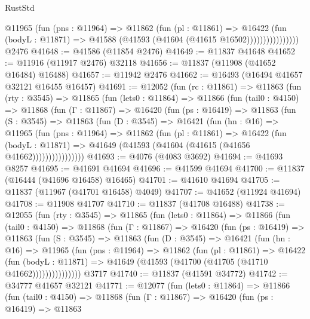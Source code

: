 \begin{lexlean}{RustStd}
\begin{coremodule}
                      @11965
                        (fun (pns : @11964) =>
                        @11862
                          (fun (pl : @11861) =>
                          @16422
                            (fun (bodyL : @11871) =>
                            @41588 (@41593 (@41604 (@41615 @16502))))))))))))))))
    @2476
@41648 := @41586 (@11854 @2476)
@41649 := @11837 @41648
@41652 := @11916 (@11917 @2476) @32118
@41656 := @11837 (@11908 (@41652 @16484) @16488)
@41657 := @11942 @2476
@41662 := @16493 (@16494 @41657 @32121 @16455 @16457)
@41691 := @12052
    (fun (rc : @11861) =>
    @11863
      (fun (rty : @3545) =>
      @11865
        (fun (lets0 : @11864) =>
        @11866
          (fun (tail0 : @4150) =>
          @11868
            (fun (Γ : @11867) =>
            @16420
              (fun (ps : @16419) =>
              @11863
                (fun (S : @3545) =>
                @11863
                  (fun (D : @3545) =>
                  @16421
                    (fun (hn : @16) =>
                    @11965
                      (fun (pns : @11964) =>
                      @11862
                        (fun (pl : @11861) =>
                        @16422
                          (fun (bodyL : @11871) =>
                          @41649 (@41593 (@41604 (@41615 (@41656 @41662))))))))))))))))
@41693 := @4076 (@4083 @3692)
@41694 := @41693 @8257
@41695 := @41691 @41694
@41696 := @41599 @41694
@41700 := @11837 (@16444 (@41696 @16458) @16465)
@41701 := @41610 @41694
@41705 := @11837 (@11967 (@41701 @16458) @4049)
@41707 := @41652 (@11924 @41694)
@41708 := @11908 @41707
@41710 := @11837 (@41708 @16488)
@41738 := @12055
    (fun (rty : @3545) =>
    @11865
      (fun (lets0 : @11864) =>
      @11866
        (fun (tail0 : @4150) =>
        @11868
          (fun (Γ : @11867) =>
          @16420
            (fun (ps : @16419) =>
            @11863
              (fun (S : @3545) =>
              @11863
                (fun (D : @3545) =>
                @16421
                  (fun (hn : @16) =>
                  @11965
                    (fun (pns : @11964) =>
                    @11862
                      (fun (pl : @11861) =>
                      @16422
                        (fun (bodyL : @11871) =>
                        @41649 (@41593 (@41700 (@41705 (@41710 @41662)))))))))))))))
    @3717
@41740 := @11837 (@41591 @34772)
@41742 := @34777 @41657 @32121
@41771 := @12077
    (fun (lets0 : @11864) =>
    @11866
      (fun (tail0 : @4150) =>
      @11868
        (fun (Γ : @11867) =>
        @16420
          (fun (ps : @16419) =>
          @11863

\end{coremodule}
\end{lexlean}
